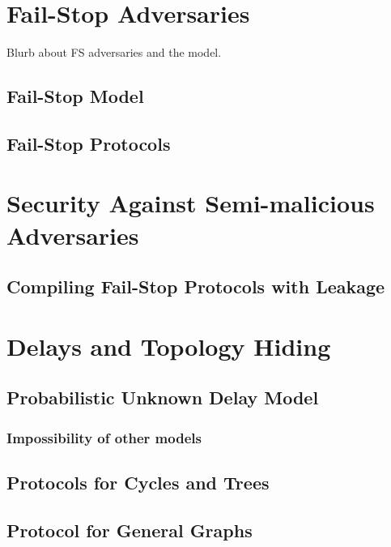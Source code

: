 \section{Fail-Stop Adversaries}
Blurb about FS adversaries and the model.

\subsection{Fail-Stop Model}
\label{sec:fs-model}

\subsection{Fail-Stop Protocols}\label{sec:FS-protocols}


\section{Security Against Semi-malicious Adversaries}\label{sec:semimal}


\subsection{Compiling Fail-Stop Protocols with Leakage}
\label{sec:composition}


\section{Delays and Topology Hiding}


\subsection{Probabilistic Unknown Delay Model}


\subsubsection{Impossibility of other models}


\subsection{Protocols for Cycles and Trees}




\subsection{Protocol for General Graphs}



